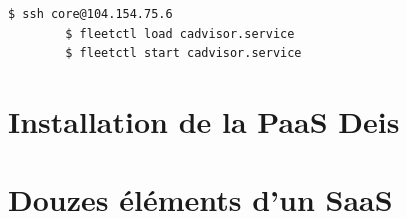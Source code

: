 	\begin{lstlisting}[language=bash,caption=Lancement des services]
		$ ssh core@104.154.75.6 
		$ fleetctl load cadvisor.service
		$ fleetctl start cadvisor.service
	\end{lstlisting}



\chapter{Installation de la PaaS Deis}

\chapter{Douzes éléments d'un SaaS}
